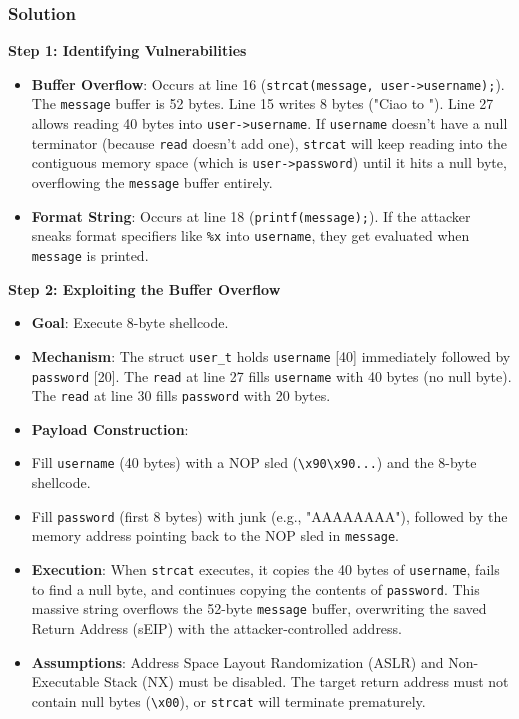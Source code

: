 \documentclass{article}
\begin{document}
\subsubsection*{Solution}
\textbf{Step 1: Identifying Vulnerabilities}
\begin{itemize}
    \item[\textbf{1.}] \textbf{Buffer Overflow}: Occurs at line 16 (\texttt{strcat(message, user->username);}). The \texttt{message} buffer is 52 bytes. Line 15 writes 8 bytes ("Ciao to "). Line 27 allows reading 40 bytes into \texttt{user->username}. If \texttt{username} doesn't have a null terminator (because \texttt{read} doesn't add one), \texttt{strcat} will keep reading into the contiguous memory space (which is \texttt{user->password}) until it hits a null byte, overflowing the \texttt{message} buffer entirely.
    \item[\textbf{2.}] \textbf{Format String}: Occurs at line 18 (\texttt{printf(message);}). If the attacker sneaks format specifiers like \texttt{\%x} into \texttt{username}, they get evaluated when \texttt{message} is printed.

\end{itemize}
\textbf{Step 2: Exploiting the Buffer Overflow}
\begin{itemize}
    \item \textbf{Goal}: Execute 8-byte shellcode.
    \item \textbf{Mechanism}: The struct \texttt{user\_t} holds \texttt{username} [40] immediately followed by \texttt{password} [20]. The \texttt{read} at line 27 fills \texttt{username} with 40 bytes (no null byte). The \texttt{read} at line 30 fills \texttt{password} with 20 bytes.
    \item \textbf{Payload Construction}:
    \item[\textbf{1.}] Fill \texttt{username} (40 bytes) with a NOP sled (\texttt{\textbackslash{}x90\textbackslash{}x90...}) and the 8-byte shellcode.
    \item[\textbf{2.}] Fill \texttt{password} (first 8 bytes) with junk (e.g., "AAAAAAAA"), followed by the memory address pointing back to the NOP sled in \texttt{message}.
    \item \textbf{Execution}: When \texttt{strcat} executes, it copies the 40 bytes of \texttt{username}, fails to find a null byte, and continues copying the contents of \texttt{password}. This massive string overflows the 52-byte \texttt{message} buffer, overwriting the saved Return Address (sEIP) with the attacker-controlled address.
    \item \textbf{Assumptions}: Address Space Layout Randomization (ASLR) and Non-Executable Stack (NX) must be disabled. The target return address must not contain null bytes (\texttt{\textbackslash{}x00}), or \texttt{strcat} will terminate prematurely.

\end{itemize}
\end{document}
